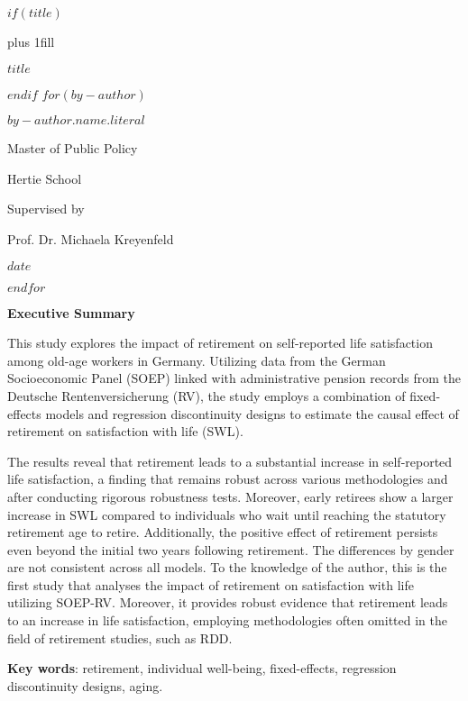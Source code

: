 $if(title)$
\cleardoublepage
\thispagestyle{empty}
{\centering
\hbox{}\vskip 0cm plus 1fill
{\Huge\bfseries $title$ \par}
$endif$
\vspace{12ex}
$for(by-author)$
{\Large\bfseries $by-author.name.literal$ \par}
\vspace{3ex}
{\Large Master of Public Policy \par}
\vspace{2ex}
{\Large Hertie School \par}
\vspace{20ex}
{\large Supervised by \par}
\vspace{2ex}
{\large Prof. Dr. Michaela Kreyenfeld \par}
\vspace{5ex}
{\bfseries\large $date$ \par}
\vspace{25ex}
$endfor$%
}

\newpage


\begin{center}
{\bfseries\large Executive Summary \par}
\end{center}

\vspace*{\baselineskip}

This study explores the impact of retirement on self-reported life satisfaction among old-age workers in Germany. Utilizing data from the German Socioeconomic Panel (SOEP) linked with administrative pension records from the Deutsche Rentenversicherung (RV), the study employs a combination of fixed-effects models and regression discontinuity designs to estimate the causal effect of retirement on satisfaction with life (SWL).

The results reveal that retirement leads to a substantial increase in self-reported life satisfaction, a finding that remains robust across various methodologies and after conducting rigorous robustness tests. Moreover, early retirees show a larger increase in SWL compared to individuals who wait until reaching the statutory retirement age to retire. Additionally, the positive effect of retirement persists even beyond the initial two years following retirement. The differences by gender are not consistent across all models. To the knowledge of the author, this is the first study that analyses the impact of retirement on satisfaction with life utilizing SOEP-RV. Moreover, it provides robust evidence that retirement leads to an increase in life satisfaction, employing methodologies often omitted in the field of retirement studies, such as RDD. 

{\bfseries Key words}: retirement, individual well-being, fixed-effects, regression discontinuity designs, aging. 

\newpage